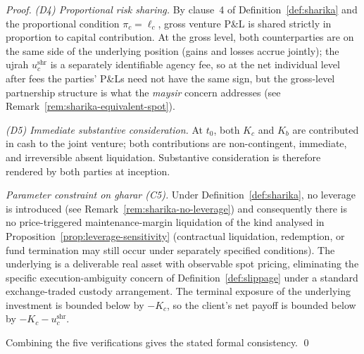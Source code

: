 \documentclass[preprint,12pt,authoryear]{elsarticle}
\theoremstyle{definition}
\begin{document}
\begin{proof}
\emph{(D4) Proportional risk sharing.} By clause~4 of
Definition~\ref{def:sharika} and the proportional condition
$\pi_c = \ell_c$, gross venture P\&L is shared strictly in
proportion to capital contribution. At the gross level, both
counterparties are on the same side of the underlying position
(gains and losses accrue jointly); the ujrah $u^{\text{shr}}_c$
is a separately identifiable agency fee, so at the net
individual level after fees the parties' P\&Ls need not have
the same sign, but the gross-level partnership structure is
what the \emph{maysir} concern addresses (see
Remark~\ref{rem:sharika-equivalent-spot}).

\emph{(D5) Immediate substantive consideration.} At $t_0$, both
$K_c$ and $K_b$ are contributed in cash to the joint venture;
both contributions are non-contingent, immediate, and
irreversible absent liquidation. Substantive consideration is
therefore rendered by both parties at inception.

\emph{Parameter constraint on \emph{gharar} (C5).} Under
Definition~\ref{def:sharika}, no leverage is introduced (see
Remark~\ref{rem:sharika-no-leverage}) and consequently there is
no price-triggered maintenance-margin liquidation of the kind
analysed in Proposition~\ref{prop:leverage-sensitivity}
(contractual liquidation, redemption, or fund termination may
still occur under separately specified conditions). The
underlying is a deliverable real asset with observable spot
pricing, eliminating the specific execution-ambiguity concern
of Definition~\ref{def:slippage} under a standard
exchange-traded custody arrangement. The terminal exposure of
the underlying investment is bounded below by $-K_c$, so the
client's net payoff is bounded below by $-K_c - u^{\text{shr}}_c$.

Combining the five verifications gives the stated formal
consistency. \qed
\end{proof}
\end{document}
